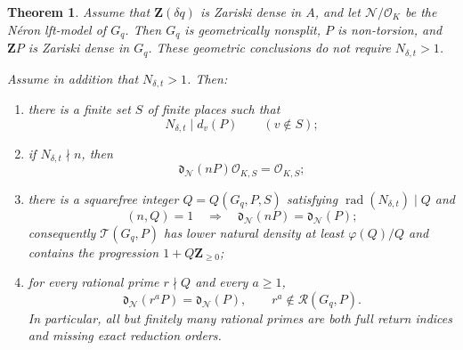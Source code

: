 \documentclass[10pt,a4paper]{amsart}
\newtheorem{theorem}{Theorem}
\newcommand{\Ner}{\mathcal N}
\newcommand{\OK}{\mathcal O_K}
\newcommand{\Z}{\mathbf Z}
\newcommand{\cO}{\mathcal O}
\newcommand{\dd}{\mathfrak d}
\newcommand{\rad}{\operatorname{rad}}
\begin{document}
\begin{theorem}
\label{thm:main}
Assume that $\mathbf Z(\delta q)$ is Zariski dense in $A$, and let
$\Ner/\OK$ be the N\'eron lft-model of $G_q$.  Then $G_q$ is geometrically
nonsplit, $P$ is non-torsion, and $\mathbf ZP$ is Zariski dense in $G_q$.
These geometric conclusions do not require $N_{\delta,t}>1$.

Assume in addition that $N_{\delta,t}>1$.  Then:
\begin{enumerate}[label=\textup{(\roman*)}]
\item there is a finite set $S$ of finite places such that
\begin{equation}\label{eq:N-divides-orders}
 N_{\delta,t}\mid d_v(P)\qquad(v\notin S);
\end{equation}
\item if $N_{\delta,t}\nmid n$, then
\begin{equation}\label{eq:localized-blanking}
 \dd_{\Ner}(nP)\cO_{K,S}=\cO_{K,S};
\end{equation}
\item there is a squarefree integer $Q=Q(G_q,P,S)$ satisfying
$\rad(N_{\delta,t})\mid Q$ and
\begin{equation}\label{eq:global-coprime-return}
 (n,Q)=1
 \quad\Longrightarrow\quad
 \dd_{\Ner}(nP)=\dd_{\Ner}(P);
\end{equation}
consequently $\mathscr T(G_q,P)$ has lower natural density at least
$\varphi(Q)/Q$ and contains the progression $1+Q\Z_{\ge0}$;
\item for every rational prime $r\nmid Q$ and every $a\ge1$,
\begin{equation}\label{eq:prime-power-return}
 \dd_{\Ner}(r^{a}P)=\dd_{\Ner}(P),
 \qquad
 r^a\notin\mathscr R(G_q,P).
\end{equation}
In particular, all but finitely many rational primes are both full return
indices and missing exact reduction orders.
\end{enumerate}
\end{theorem}
\end{document}
